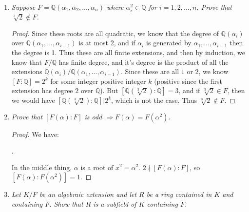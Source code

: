 \documentclass[9pt,reqno,twoside]{amsbook}
\theoremstyle{plain}
\numberwithin{section}{chapter}
\numberwithin{equation}{chapter}
\theoremstyle{definition}
\theoremstyle{remark}
\theoremstyle{plain}
\newcommand{\Q}{\mathbb{Q}}
\begin{document}
\begin{enumerate}[label=\arabic*.]
\item \textit{Suppose $F = \Q(\alpha_1,\alpha_2,...,\alpha_n)$ where $\alpha_i^2 \in \Q$ for $i = 1,2,...,n$. Prove that $\sqrt[3]{2} \notin F$. }

\begin{proof}
Since these roots are all quadratic, we know that the degree of $\Q(\alpha_i)$ over $\Q(\alpha_1,...,\alpha_{i - 1})$ is at most 2, and if $\alpha_i$ is generated by $\alpha_1,...,\alpha_{i - 1}$ then the degree is 1. Thus these are all finite extensions, and then by induction, we know that $F/\Q$ has finite degree, and it's degree is the product of all the extensions $\Q(\alpha_i)/\Q(\alpha_1,...,\alpha_{i - 1})$. Since these are all $1$ or $2$, we know $[F:\Q] = 2^k$ for some integer positive integer $k$ (positive since the first extension has degree $2$ over $\Q$). But $[\Q(\sqrt[3]{2}):\Q] = 3$, and if $\sqrt[3]{2} \in F$, then we would have $[\Q(\sqrt[3]{2}):\Q]|2^k$, which is not the case. Thus $\sqrt[3]{2} \notin F$. 
\end{proof}

\setcounter{enumi}{13}

\item \textit{Prove that $[F(\alpha):F]$ is odd $\Rightarrow F(\alpha) = F(\alpha^2)$. }

\begin{proof}
We have:
\begin{center}
.
\end{center}
In the middle thing, $\alpha$ is a root of $x^2 = \alpha^2$. $2 \nmid [F(\alpha):F]$, so $[F(\alpha):F(\alpha^2)] = 1$. 
\end{proof}

\setcounter{enumi}{15}

\item \textit{Let $K/F$ be an algebraic extension and let $R$ be a ring contained in $K$ and containing $F$. Show that $R$ is a subfield of $K$ containing $F$. }


\end{enumerate}
\end{document}
